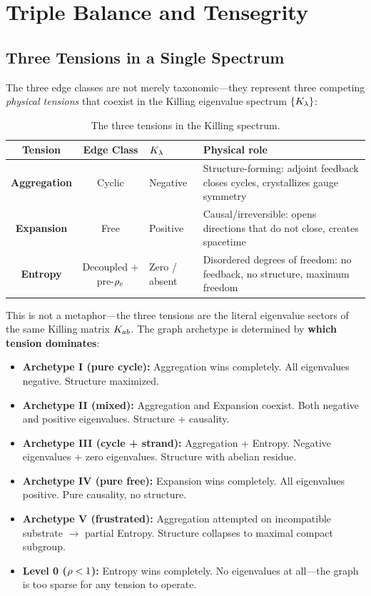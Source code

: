 \section{Triple Balance and Tensegrity}\label{sec:triple_balance}

\subsection{Three Tensions in a Single Spectrum}\label{sec:three_tensions}

The three edge classes are not merely taxonomic---they represent three competing \emph{physical tensions} that coexist in the Killing eigenvalue spectrum $\{K_\lambda\}$:

\begin{table}[h]
\centering
\begin{tabular}{c c l l}
\hline\hline
Tension & Edge Class & $K_\lambda$ & Physical role \\
\hline
\textbf{Aggregation} & Cyclic & Negative & Structure-forming: adjoint feedback closes cycles, crystallizes gauge symmetry \\
\textbf{Expansion} & Free & Positive & Causal/irreversible: opens directions that do not close, creates spacetime \\
\textbf{Entropy} & Decoupled + pre-$\rho_c$ & Zero / absent & Disordered degrees of freedom: no feedback, no structure, maximum freedom \\
\hline\hline
\end{tabular}
\caption{The three tensions in the Killing spectrum.}
\end{table}

This is not a metaphor---the three tensions are the literal eigenvalue sectors of the same Killing matrix $K_{ab}$. The graph archetype is determined by \textbf{which tension dominates}:

\begin{itemize}
    \item \textbf{Archetype I (pure cycle):} Aggregation wins completely. All eigenvalues negative. Structure maximized.
    \item \textbf{Archetype II (mixed):} Aggregation and Expansion coexist. Both negative and positive eigenvalues. Structure + causality.
    \item \textbf{Archetype III (cycle + strand):} Aggregation + Entropy. Negative eigenvalues + zero eigenvalues. Structure with abelian residue.
    \item \textbf{Archetype IV (pure free):} Expansion wins completely. All eigenvalues positive. Pure causality, no structure.
    \item \textbf{Archetype V (frustrated):} Aggregation attempted on incompatible substrate $\to$ partial Entropy. Structure collapses to maximal compact subgroup.
    \item \textbf{Level 0 ($\rho < 1$):} Entropy wins completely. No eigenvalues at all---the graph is too sparse for any tension to operate.
\end{itemize}


